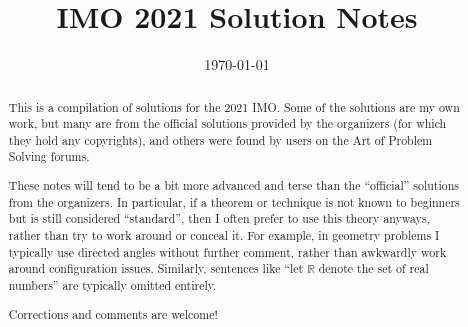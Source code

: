 \documentclass[11pt]{scrartcl}
\title{IMO 2021 Solution Notes}
\date{\today}
\begin{document}
\maketitle

\begin{abstract}
This is a compilation of solutions
for the 2021 IMO.
Some of the solutions are my own work,
but many are from the official solutions provided by the organizers
(for which they hold any copyrights),
and others were found by users on the Art of Problem Solving forums.

These notes will tend to be a bit more advanced and terse than the ``official''
solutions from the organizers.
In particular, if a theorem or technique is not known to beginners
but is still considered ``standard'', then I often prefer to
use this theory anyways, rather than try to work around or conceal it.
For example, in geometry problems I typically use directed angles
without further comment, rather than awkwardly work around configuration issues.
Similarly, sentences like ``let $\mathbb{R}$ denote the set of real numbers''
are typically omitted entirely.

Corrections and comments are welcome!
\end{abstract}

\tableofcontents
\newpage

\addtocounter{section}{-1}
\end{document}
